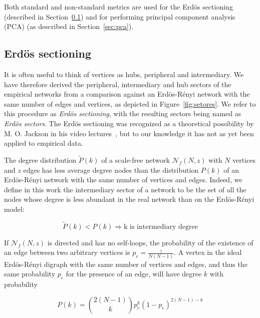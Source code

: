 \documentclass[%
aip,
jmp,%
amsmath,amssymb,
reprint,%
]{revtex4-1}
\begin{document}
Both standard and non-standard metrics are used for the Erd\"os sectioning (described in Section~\ref{sectioning}) and for performing principal component analysis (PCA) (as described in Section~\ref{sec:pca}).


\subsection{Erd\"os sectioning}\label{sectioning}
It is often useful to think of vertices as hubs, peripheral and intermediary. We have therefore derived the peripheral, intermediary and hub sectors of the empirical networks from a comparison against an Erd\"os-R\'enyi network with the same number of edges and vertices,
as depicted in Figure~\ref{fig:setores}. We refer to this procedure as \emph{Erd\"os sectioning}, with the resulting sectors being named as \emph{Erd\"os sectors}. The Erd\"os sectioning was recognized as a theoretical possibility by M. O. Jackson in his video lectures~\cite{3setores}, but to our knowledge it has not as yet been applied to empirical data.

The degree distribution $\widetilde{P}(k)$ of a scale-free network $\mathcal{N}_f(N,z)$ with $N$ vertices and $z$ edges has less
average degree nodes than the distribution $P(k)$ of an Erd\"os-R\'enyi
network with the same number of vertices and edges. Indeed, we define in this work the intermediary sector of a network to be the set of all the nodes whose degree is less abundant in the real network than on the Erd\"os-R\'enyi model:

\begin{equation}\label{criterio}
\widetilde{P}(k)<P(k) \Rightarrow \text{k is intermediary degree}
\end{equation}

If $\mathcal{N}_f(N,z)$ is directed and has no self-loops, the probability of the existence
of an edge between two arbitrary vertices is $p_e=\frac{z}{N(N-1)}$.
A vertex in the ideal Erd\"os-R\'enyi digraph with the same number of vertices and edges, and thus the same probability $p_e$ for the presence of an edge, will have degree $k$ with probability

\begin{equation}
P(k)=\binom{2(N-1)}{k}p_e^k(1-p_e)^{2(N-1)-k}
\end{equation}
\end{document}
